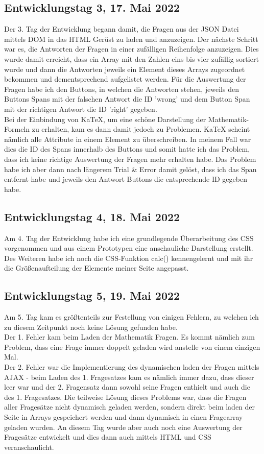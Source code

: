\documentclass[a4paper,12pt,titlepage]{scrartcl}
\begin{document}
        \subsection{Entwicklungstag 3, 17. Mai 2022}
            Der 3. Tag der Entwicklung begann damit, die Fragen aus der JSON Datei mittels DOM in das HTML Gerüst zu laden und anzuzeigen. Der nächste Schritt war es, die Antworten der Fragen in einer zufälligen Reihenfolge anzuzeigen. Dies wurde damit erreicht, dass ein Array mit den Zahlen eins bis vier zufällig sortiert wurde und dann die Antworten jeweils ein Element dieses Arrays zugeordnet bekommen und dementsprechend aufgelistet werden.
            Für die Auswertung der Fragen habe ich den Buttons, in welchen die Antworten stehen, jeweils den Buttons Spans mit der falschen Antwort die ID 'wrong' und dem Button Span mit der richtigen Antwort die ID 'right' gegeben.\\
            Bei der Einbindung von KaTeX, um eine schöne Darstellung der Mathematik-Formeln zu erhalten, kam es dann damit jedoch zu Problemen. KaTeX scheint nämlich alle Attribute in einem Element zu überschreiben. In meinem Fall war dies die ID des Spans innerhalb des Buttons und somit hatte ich das Problem, dass ich keine richtige Auswertung der Fragen mehr erhalten habe. Das Problem habe ich aber dann nach längerem Trial \& Error damit gelöst, dass ich das Span entfernt habe und jeweils den Antwort Buttons die entsprechende ID gegeben habe.
        \subsection{Entwicklungstag 4, 18. Mai 2022}
            Am 4. Tag der Entwicklung habe ich eine grundlegende Überarbeitung des CSS vorgenommen und aus einem Prototypen eine anschauliche Darstellung erstellt. Des Weiteren habe ich noch die CSS-Funktion calc() kennengelernt und mit ihr die Größenaufteilung der Elemente meiner Seite angepasst.
        \subsection{Entwicklungstag 5, 19. Mai 2022}
            Am 5. Tag kam es größtenteils zur Festellung von einigen Fehlern, zu welchen ich zu diesem Zeitpunkt noch keine Lösung gefunden habe.\\
            Der 1. Fehler kam beim Laden der Mathematik Fragen. Es kommt nämlich zum Problem, dass eine Frage immer doppelt geladen wird anstelle von einem einzigen Mal.\\
            Der 2. Fehler war die Implementierung des dynamischen laden der Fragen mittels AJAX - beim Laden des 1. Fragesatzes kam es nämlich immer dazu, dass dieser leer war und der 2. Fragensatz dann sowohl seine Fragen enthielt und auch die des 1. Fragesatzes. Die teilweise Lösung dieses Problems war, dass die Fragen aller Fragesätze nicht dynamisch geladen werden, sondern direkt beim laden der Seite in Arrays gespeichert werden und dann dynamisch in einen Fragearray geladen wurden.
            An diesem Tag wurde aber auch noch eine Auswertung der Fragesätze entwickelt und dies dann auch mittels HTML und CSS veranschaulicht.
\end{document}
